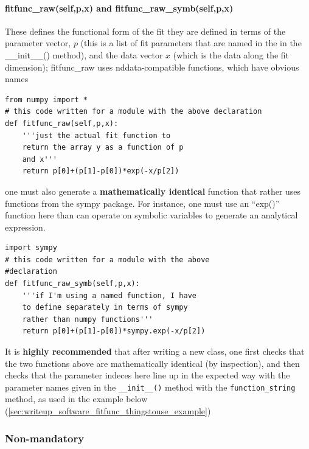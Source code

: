 \paragraph{fitfunc\_raw(self,p,x) and fitfunc\_raw\_symb(self,p,x)}
These defines the functional form of the fit
    they are defined in terms of the parameter vector, $p$
    (this is a list of fit parameters that are named in
    the in the \_\_init\_\_() method),
    and the data vector $x$ (which is the data along
    the fit dimension);
fitfunc\_raw uses nddata-compatible functions, which have obvious names
\begin{lstlisting}
from numpy import *
# this code written for a module with the above declaration
def fitfunc_raw(self,p,x):
    '''just the actual fit function to
    return the array y as a function of p
    and x'''
    return p[0]+(p[1]-p[0])*exp(-x/p[2])
\end{lstlisting}
one must also generate a {\bf mathematically identical}
    function that rather uses functions from the sympy package.
For instance, one must use an ``exp()'' function here
    than can operate on symbolic variables to generate
    an analytical expression.
\begin{lstlisting}
import sympy
# this code written for a module with the above
#declaration
def fitfunc_raw_symb(self,p,x):
    '''if I'm using a named function, I have
    to define separately in terms of sympy
    rather than numpy functions'''
    return p[0]+(p[1]-p[0])*sympy.exp(-x/p[2])
\end{lstlisting}
It is {\bf highly recommended} that after writing a new class,
    one first checks that the two functions above are mathematically identical (by inspection),
    and then checks that the parameter indeces here
    line up in the expected way with the parameter
    names given in the {\tt \_\_init\_\_()} method
    with the {\tt function\_string} method, as used in the example
    below (\ref{sec:writeup_software_fitfunc_thingstouse_example})
\subsubsection{Non-mandatory}
